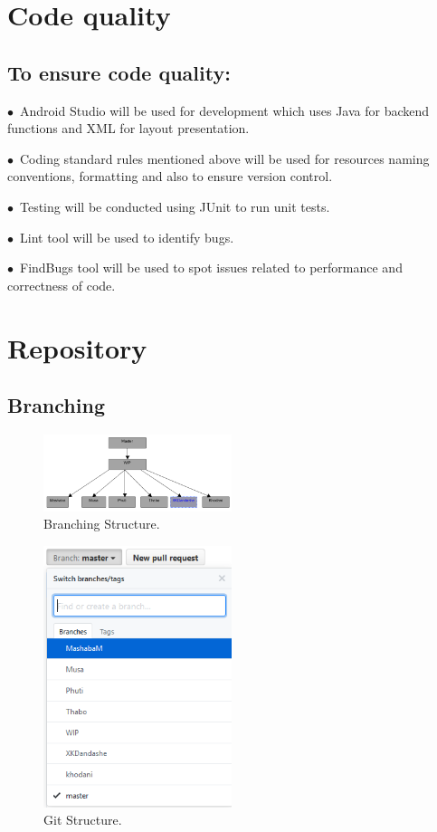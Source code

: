 \documentclass[english]{article}
\begin{document}
\section{Code quality}
\subsection{To ensure code quality:}
$\bullet$\ Android Studio will be used for development which uses Java for backend functions and XML for layout presentation. \par
$\bullet$\ Coding standard rules mentioned above will be used for resources naming conventions, formatting and also to ensure version control.
 \par
$\bullet$\ Testing will be conducted using JUnit to run unit tests. \par
$\bullet$\ Lint tool will be used to identify bugs. \par
$\bullet$\ FindBugs tool will be used to spot issues related to performance and correctness of code. \par

\section{Repository}

\subsection{Branching}		

\begin{figure}
	\caption{Branching Structure.}
	\label{wrap-fig:7}
	\includegraphics[width=5.5cm]{images/Branching.png}
\end{figure} 
\begin{figure}
	\caption{Git Structure.}
	\label{wrap-fig:8}
	\includegraphics[width=5.5cm]{images/GitStructure.png}
\end{figure} 
\end{document}
